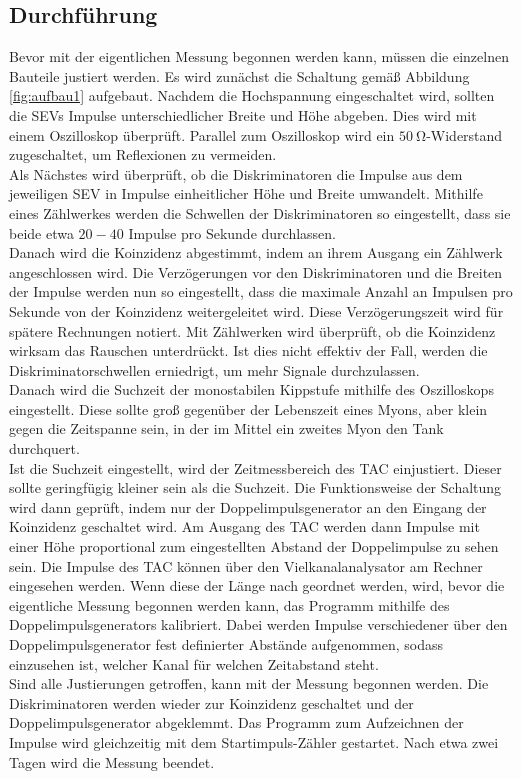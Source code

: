 \subsection{Durchführung}
\label{sec:durchführung}

Bevor mit der eigentlichen Messung begonnen werden kann, müssen die einzelnen Bauteile justiert werden.
Es wird zunächst die Schaltung gemäß Abbildung \ref{fig:aufbau1} aufgebaut.
Nachdem die Hochspannung eingeschaltet wird, sollten die SEVs Impulse unterschiedlicher Breite und Höhe abgeben.
Dies wird mit einem Oszilloskop überprüft.
Parallel zum Oszilloskop wird ein $\SI{50}{\ohm}$-Widerstand zugeschaltet, um Reflexionen zu vermeiden.\\
Als Nächstes wird überprüft, ob die Diskriminatoren die Impulse aus dem jeweiligen SEV in Impulse einheitlicher Höhe und Breite umwandelt.
Mithilfe eines Zählwerkes werden die Schwellen der Diskriminatoren so eingestellt, dass sie beide etwa $20-40$ Impulse pro Sekunde durchlassen.\\
Danach wird die Koinzidenz abgestimmt, indem an ihrem Ausgang ein Zählwerk angeschlossen wird.
Die Verzögerungen vor den Diskriminatoren und die Breiten der Impulse werden nun so eingestellt, dass die maximale Anzahl an Impulsen pro Sekunde von der Koinzidenz weitergeleitet wird.
Diese Verzögerungszeit wird für spätere Rechnungen notiert.
Mit Zählwerken wird überprüft, ob die Koinzidenz wirksam das Rauschen unterdrückt.
Ist dies nicht effektiv der Fall, werden die Diskriminatorschwellen erniedrigt, um mehr Signale durchzulassen.\\
Danach wird die Suchzeit der monostabilen Kippstufe mithilfe des Oszilloskops eingestellt.
Diese sollte groß gegenüber der Lebenszeit eines Myons, aber klein gegen die Zeitspanne sein, in der im Mittel ein zweites Myon den Tank durchquert.\\
Ist die Suchzeit eingestellt, wird der Zeitmessbereich des TAC einjustiert.
Dieser sollte geringfügig kleiner sein als die Suchzeit.
Die Funktionsweise der Schaltung wird dann geprüft, indem nur der Doppelimpulsgenerator an den Eingang der Koinzidenz geschaltet wird.
Am Ausgang des TAC werden dann Impulse mit einer Höhe proportional zum eingestellten Abstand der Doppelimpulse zu sehen sein.
Die Impulse des TAC können über den Vielkanalanalysator am Rechner eingesehen werden.
Wenn diese der Länge nach geordnet werden, wird, bevor die eigentliche Messung begonnen werden kann, das Programm mithilfe des Doppelimpulsgenerators kalibriert.
Dabei werden Impulse verschiedener über den Doppelimpulsgenerator fest definierter Abstände aufgenommen, sodass einzusehen ist, welcher Kanal für welchen Zeitabstand steht.\\
Sind alle Justierungen getroffen, kann mit der Messung begonnen werden.
Die Diskriminatoren werden wieder zur Koinzidenz geschaltet und der Doppelimpulsgenerator abgeklemmt.
Das Programm zum Aufzeichnen der Impulse wird gleichzeitig mit dem Startimpuls-Zähler gestartet.
Nach etwa zwei Tagen wird die Messung beendet.
